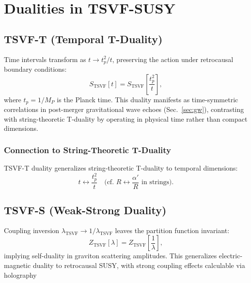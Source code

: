 \documentclass[twocolumn,superscriptaddress,floatfix]{revtex4-2}
\begin{document}
\section{Dualities in TSVF-SUSY}  
\label{sec:dualities}  

\subsection{TSVF-T (Temporal T-Duality)}  
\label{subsec:t_duality}  

Time intervals transform as \( t \to t_p^2 / t \), preserving the action under retrocausal boundary conditions:  
\begin{equation}  
S_{\text{TSVF}}[t] = S_{\text{TSVF}}\!\left[\frac{t_p^2}{t}\right],  
\label{eq:t_duality}  
\end{equation}  
where \( t_p = 1/M_P \) is the Planck time. This duality manifests as time-symmetric correlations in post-merger gravitational wave echoes (Sec.~\ref{sec:gw}), contrasting with string-theoretic T-duality \cite{Polchinski1998} by operating in physical time rather than compact dimensions.  

\subsubsection{Connection to String-Theoretic T-Duality}  
TSVF-T duality generalizes string-theoretic T-duality \cite{Polchinski1998} to temporal dimensions:  
\begin{equation}  
t \leftrightarrow \frac{t_p^2}{t} \quad \text{(cf. } R \leftrightarrow \frac{\alpha'}{R} \text{ in strings)}.  
\end{equation}  

\subsection{TSVF-S (Weak-Strong Duality)}  
\label{subsec:s_duality}  

Coupling inversion \( \lambda_{\text{TSVF}} \to 1/\lambda_{\text{TSVF}} \) leaves the partition function invariant:  
\begin{equation}  
Z_{\text{TSVF}}[\lambda] = Z_{\text{TSVF}}\!\left[\frac{1}{\lambda}\right],  
\label{eq:s_duality}  
\end{equation}  
implying self-duality in graviton scattering amplitudes. This generalizes electric-magnetic duality \cite{Montonen1977} to retrocausal SUSY, with strong coupling effects calculable via holography
\end{document}
